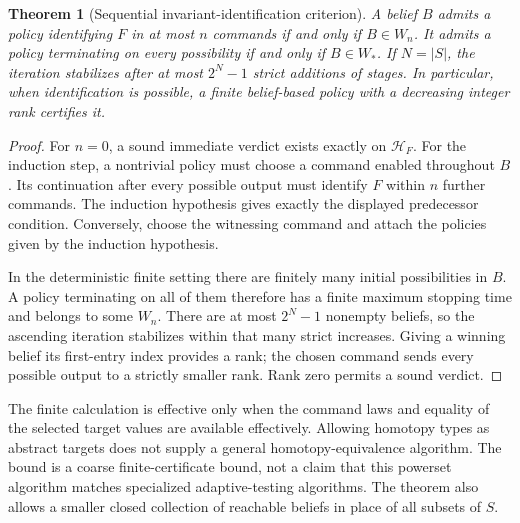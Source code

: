 \documentclass[11pt]{article}
\newtheorem{theorem}{Theorem}[section]
\theoremstyle{definition}
\begin{document}
\begin{theorem}[Sequential invariant-identification criterion]
\label{seq:criterion}
A belief $B$ admits a policy identifying $F$ in at most $n$ commands if and
only if $B\in W_n$. It admits a policy terminating on every possibility if
and only if $B\in W_*$. If $N=|S|$, the iteration stabilizes after at most
$2^N-1$ strict additions of stages. In particular, when identification is
possible, a finite belief-based policy with a decreasing integer rank
certifies it.
\end{theorem}
\begin{proof}
For $n=0$, a sound immediate verdict exists exactly on $\mathcal H_F$.
For the induction step, a nontrivial policy must choose a command enabled
throughout $B$. Its continuation after every possible output must identify
$F$ within $n$ further commands. The induction hypothesis gives exactly the
displayed predecessor condition. Conversely, choose the witnessing command
and attach the policies given by the induction hypothesis.

In the deterministic finite setting there are finitely many initial
possibilities in $B$. A policy terminating on all of them therefore has a
finite maximum stopping time and belongs to some $W_n$. There are at most
$2^N-1$ nonempty beliefs, so the ascending iteration stabilizes within that
many strict increases. Giving a winning belief its first-entry index
provides a rank; the chosen command sends every possible output to a
strictly smaller rank. Rank zero permits a sound verdict.
\end{proof}

The finite calculation is effective only when the command laws and equality of the selected target values are available effectively. Allowing homotopy types as abstract targets does not supply a general homotopy-equivalence algorithm. The bound is a coarse finite-certificate bound, not a claim that this
powerset algorithm matches specialized adaptive-testing algorithms.
The theorem also allows a smaller closed collection of reachable beliefs
in place of all subsets of $S$.
\end{document}
